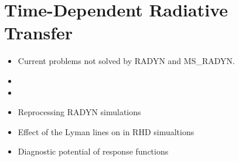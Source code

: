 \chapter{Time-Dependent Radiative Transfer}

\begin{itemize}
    \item Current problems not solved by RADYN and MS\_RADYN.
    \item \Lw{}
    \item \MsLw{}
    \item Reprocessing RADYN simulations
    \item Effect of the Lyman lines on \CaLine{} in RHD simualtions
    \item Diagnostic potential of response functions
\end{itemize}
